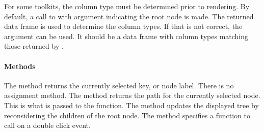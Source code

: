 For some toolkits, the column type must be determined prior to
rendering. By default, a call to  with argument
 indicating the root node is made. The returned data frame
is used to determine the column types. If that is not correct, the
argument  can be used. It should be a data
frame with column types matching those returned by .

\paragraph{Methods}
The  method returns the currently selected key,
or node label. There is no assignment method. The \method{[}{gtree}
method returns the path for the currently selected node. This is what
is passed to the  function.  The
 method updates the displayed tree by
reconsidering the children of the root node.  The method
 specifies a function to call on
a double click event.

